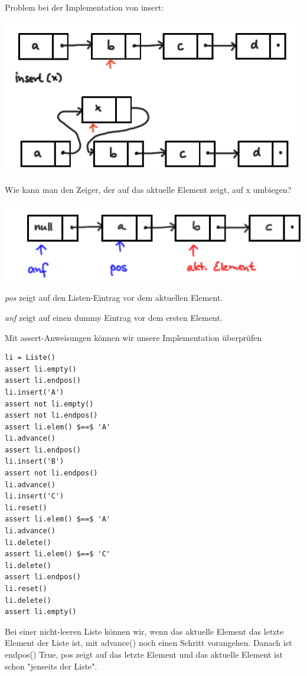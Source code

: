 \documentclass{beamer}
\begin{document}
\begin{frame}[fragile]
Problem bei der Implementation von insert:

\includegraphics[scale=0.6]{bild4.png} \pause

Wie kann man den Zeiger, der auf das aktuelle Element zeigt, auf x umbiegen?
\end{frame}


\begin{frame}[fragile]

\includegraphics[scale=0.6]{bild5.png}  

\textit{pos} zeigt auf den Listen-Eintrag vor dem aktuellen Element.   

\textit{anf} zeigt auf einen dummy Eintrag vor dem ersten Element.

\end{frame}

\begin{frame}[fragile]
Mit assert-Anweisungen können wir unsere Implementation überprüfen
\footnotesize 
\begin{lstlisting} 
li = Liste()
assert li.empty()
assert li.endpos()
li.insert('A')
assert not li.empty()
assert not li.endpos()
assert li.elem() $==$ 'A'
li.advance()
assert li.endpos()
li.insert('B')
assert not li.endpos()
li.advance()
li.insert('C')
li.reset()
assert li.elem() $==$ 'A'
li.advance()
li.delete()
assert li.elem() $==$ 'C'
li.delete()
assert li.endpos()
li.reset()
li.delete()
assert li.empty()
\end{lstlisting} 
Bei einer nicht-leeren Liste können wir, wenn das aktuelle Element das letzte Element der Liste ist, mit
advance() noch einen Schritt vorangehen. Danach ist endpos() True, pos zeigt auf das letzte Element und
das aktuelle Element ist schon "jenseits der Liste".
 
\end{frame}
\end{document}
